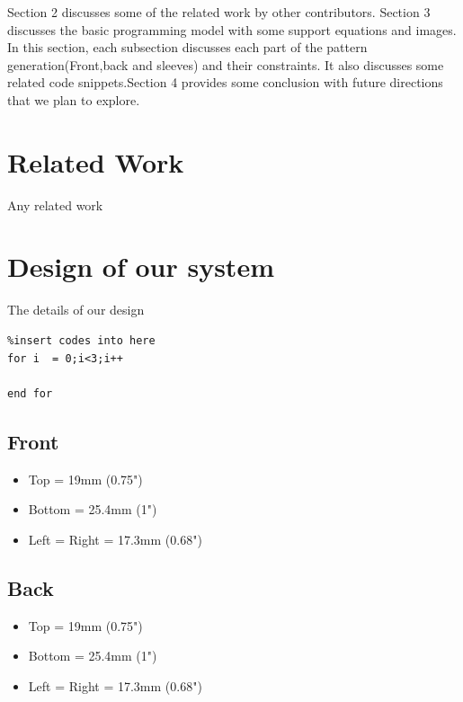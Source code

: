 \documentclass[10pt,letterpaper]{ltugboat}
\begin{document}
\par \justifying Section 2 discusses some of the related work by other contributors. Section 3 discusses the basic programming model with some support equations and images. In this section, each subsection discusses each part of the pattern generation(Front,back and sleeves) and their constraints. It also discusses some related code snippets.Section 4 provides some conclusion with future directions that we plan to explore.




\section{Related Work}

Any related work


\section{Design of our system}

The details of our design

\begin{lstlisting}
%insert codes into here
for i  = 0;i<3;i++

end for

\end{lstlisting}

\subsection{Front}
\begin{itemize}
\item	Top = 19mm (0.75")
\item	Bottom = 25.4mm (1")
\item	Left = Right = 17.3mm (0.68")
\end{itemize}

\subsection{Back}
\begin{itemize}
\item	Top = 19mm (0.75")
\item	Bottom = 25.4mm (1")
\item	Left = Right = 17.3mm (0.68")
\end{itemize}
\end{document}
